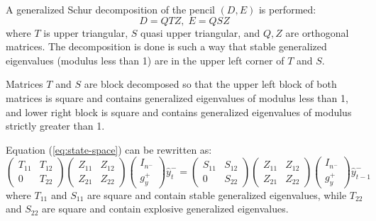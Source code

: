 \documentclass[11pt,a4paper]{article}
\begin{document}
A generalized Schur decomposition of the pencil $(D,E)$ is performed:
\begin{equation*}
  D = QTZ, \; E=QSZ
\end{equation*}
where $T$ is upper triangular, $S$ quasi upper triangular, and $Q,Z$ are orthogonal matrices. The decomposition is done is such a way that stable generalized eigenvalues (modulus less than 1) are in the upper left corner of $T$ and $S$.

Matrices $T$ and $S$ are block decomposed so that the upper left block of both matrices is square and contains generalized eigenvalues of modulus less than 1, and lower right block is square and contains generalized eigenvalues of modulus strictly greater than 1.

Equation (\ref{eq:state-space}) can be rewritten as:
\begin{equation}
  \label{eq:state-space-qz}
  \left(
    \begin{matrix}
      T_{11} & T_{12} \\
      0 & T_{22}
    \end{matrix}
  \right)
  \left(
    \begin{matrix}
      Z_{11} & Z_{12} \\
      Z_{21} & Z_{22}
    \end{matrix}
  \right)
  \left(
    \begin{matrix}
      I_{n^-} \\
      g^+_y
    \end{matrix}
  \right)
  \hat{y}^-_t
  =
  \left(
    \begin{matrix}
      S_{11} & S_{12} \\
      0 & S_{22}
    \end{matrix}
  \right)
  \left(
    \begin{matrix}
      Z_{11} & Z_{12} \\
      Z_{21} & Z_{22}
    \end{matrix}
  \right)
  \left(
    \begin{matrix}
      I_{n^-} \\
      g^+_y
    \end{matrix}
  \right)
  \hat{y}^-_{t-1}
\end{equation}
where $T_{11}$ and $S_{11}$ are square and contain stable generalized eigenvalues, while $T_{22}$ and $S_{22}$ are square and contain explosive generalized eigenvalues.
\end{document}
